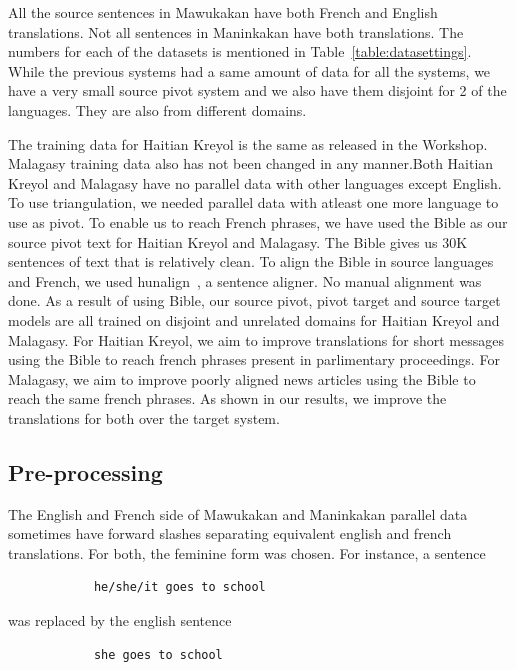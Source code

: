 

All the source sentences in Mawukakan have both French and English translations. Not all sentences in Maninkakan have both translations. The numbers for each of the datasets is mentioned in Table~\ref{table:datasettings}. While the previous systems had a same amount of data for all the systems, we have a very small source pivot system and we also have them disjoint for 2 of the languages. They are also from different domains. 

The training data for Haitian Kreyol is the same as released in the Workshop. Malagasy training data also has not been changed in any manner.Both Haitian Kreyol and Malagasy have no parallel data with other languages except English. To use triangulation, we needed parallel data with atleast one more language to use as pivot. To enable us to reach French phrases, we have used the Bible as our source pivot text for Haitian Kreyol and Malagasy. The Bible gives us 30K sentences of text that is relatively clean. To align the Bible in source languages and French, we used hunalign~\cite{Hun:05}, a sentence aligner. No manual alignment was done. As a result of using Bible, our source pivot, pivot target and source target models are all trained on disjoint and unrelated domains for Haitian Kreyol and Malagasy. For Haitian Kreyol, we aim to improve translations for short messages using the Bible to reach french phrases present in parlimentary proceedings. For Malagasy, we aim to improve poorly aligned news articles using the Bible to reach the same french phrases. As shown in our results, we improve the translations for both over the target system. 

\subsection{Pre-processing}

    The English and French side of Mawukakan and Maninkakan parallel data sometimes have forward slashes separating equivalent english and french translations. For both, the feminine form was chosen. For instance, a sentence
    \begin{verbatim}
            he/she/it goes to school
    \end{verbatim}
            was replaced by the english sentence \\
    \begin{verbatim}
            she goes to school
    \end{verbatim}

